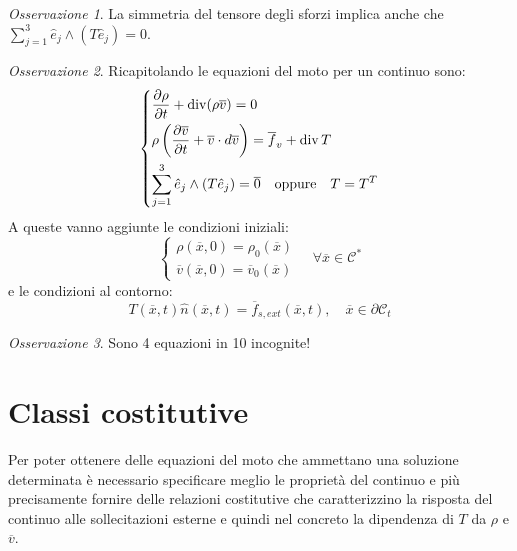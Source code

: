 \documentclass{book}
\theoremstyle{plain}
\theoremstyle{plain}
\theoremstyle{plain}
\theoremstyle{plain}
\theoremstyle{plain}
\theoremstyle{definition}
\theoremstyle{remark}
\newtheorem*{oss}{Osservazione}
\theoremstyle{definition}
\begin{document}
\begin{oss}
    La simmetria del tensore degli sforzi implica anche che $\sum_{j=1}^3\hat{e}_j\wedge(T\hat{e}_j)=0$.
\end{oss}

\begin{oss}
    Ricapitolando le equazioni del moto per un continuo sono:
    \begin{displaymath}
        \begin{dcases}
            \frac{\partial\rho}{\partial t} +\operatorname{div}(\rho\overline{v})=0\\
            \rho\left(\frac{\partial\overline{v}}{\partial t}+\overline{v}\cdot d\overline{v}\right)=\overline{f}_v+\operatorname{div}T\\
            \sum_{j=1}^3\hat{e}_j\wedge(T\hat{e}_j)=\overline{0} \quad \text{oppure} \quad T=T^T
        \end{dcases}
    \end{displaymath}
    A queste vanno aggiunte le condizioni iniziali:
        \begin{displaymath}
        \begin{cases}
            \rho(\overline{x},0)=\rho_0(\overline{x}) \\
            \overline{v}(\overline{x},0)=\overline{v}_0(\overline{x})
        \end{cases}
        \quad \forall \overline{x}\in\mathcal{C}^*
        \end{displaymath}
    e le condizioni al contorno:
    \begin{displaymath}
    T(\overline{x},t)\hat{n}(\overline{x},t)=\overline{f}_{s,ext}(\overline{x},t), \quad \overline{x}\in\partial\mathcal{C}_t
    \end{displaymath}
\end{oss}

\begin{oss}
    Sono 4 equazioni in 10 incognite!
\end{oss}

\section{Classi costitutive}

Per poter ottenere delle equazioni del moto che ammettano una soluzione determinata è necessario specificare meglio le proprietà del continuo e più precisamente fornire delle relazioni costitutive che caratterizzino la risposta del continuo alle sollecitazioni esterne e quindi nel concreto la dipendenza di $T$ da $\rho$ e $\overline{v}$. 
\end{document}

